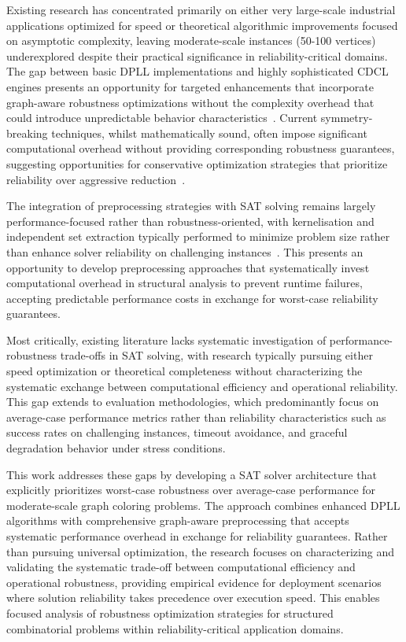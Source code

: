 Existing research has concentrated primarily on either very large-scale industrial applications optimized for speed or theoretical algorithmic improvements focused on asymptotic complexity, leaving moderate-scale instances (50-100 vertices) underexplored despite their practical significance in reliability-critical domains. The gap between basic DPLL implementations and highly sophisticated CDCL engines presents an opportunity for targeted enhancements that incorporate graph-aware robustness optimizations without the complexity overhead that could introduce unpredictable behavior characteristics~\cite{moskewicz2001chaff,marques2009handbook}. Current symmetry-breaking techniques, whilst mathematically sound, often impose significant computational overhead without providing corresponding robustness guarantees, suggesting opportunities for conservative optimization strategies that prioritize reliability over aggressive reduction~\cite{crawford1996symmetry}.

The integration of preprocessing strategies with SAT solving remains largely performance-focused rather than robustness-oriented, with kernelisation and independent set extraction typically performed to minimize problem size rather than enhance solver reliability on challenging instances~\cite{lin2012coloring,jansen2013data}. This presents an opportunity to develop preprocessing approaches that systematically invest computational overhead in structural analysis to prevent runtime failures, accepting predictable performance costs in exchange for worst-case reliability guarantees.

Most critically, existing literature lacks systematic investigation of performance-robustness trade-offs in SAT solving, with research typically pursuing either speed optimization or theoretical completeness without characterizing the systematic exchange between computational efficiency and operational reliability. This gap extends to evaluation methodologies, which predominantly focus on average-case performance metrics rather than reliability characteristics such as success rates on challenging instances, timeout avoidance, and graceful degradation behavior under stress conditions.

This work addresses these gaps by developing a SAT solver architecture that explicitly prioritizes worst-case robustness over average-case performance for moderate-scale graph coloring problems. The approach combines enhanced DPLL algorithms with comprehensive graph-aware preprocessing that accepts systematic performance overhead in exchange for reliability guarantees. Rather than pursuing universal optimization, the research focuses on characterizing and validating the systematic trade-off between computational efficiency and operational robustness, providing empirical evidence for deployment scenarios where solution reliability takes precedence over execution speed. This enables focused analysis of robustness optimization strategies for structured combinatorial problems within reliability-critical application domains.